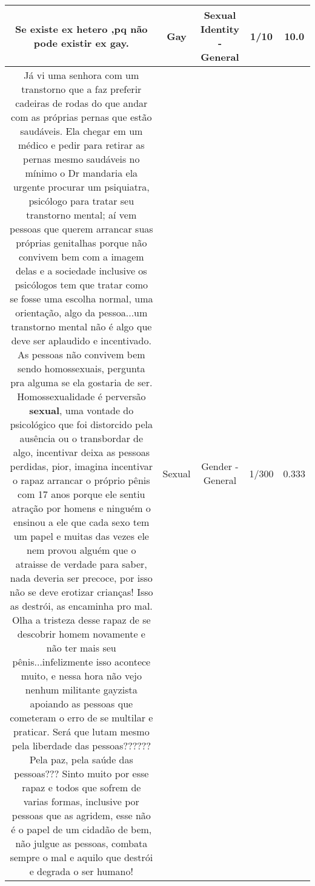 \documentclass[11pt]{article}
\newlength\mylength
\begin{document}
\begin{center}
\begin{longtable}{|C{.65\mylength}|C{.30\mylength}|C{.12\mylength}|C{.12\mylength}|C{.12\mylength}|}
  \small Se existe ex hetero ,pq não pode existir ex \textbf{gay}.\normalsize   & Gay & Sexual Identity - General & 1/10 & 10.0 \\  \hline
  \small Já vi uma senhora com um transtorno que a faz preferir cadeiras de rodas do que andar com as próprias pernas que estão saudáveis. Ela chegar em um médico e pedir para retirar as pernas mesmo saudáveis no mínimo o Dr mandaria ela urgente procurar um psiquiatra, psicólogo para tratar seu transtorno mental; aí vem pessoas que querem arrancar suas próprias genitalhas porque não convivem bem com a imagem delas e a sociedade inclusive os psicólogos tem que tratar como se fosse uma escolha normal, uma orientação, algo da pessoa...um transtorno mental não é algo que deve ser aplaudido e incentivado. As pessoas não convivem bem sendo homossexuais, pergunta pra alguma se ela gostaria de ser. Homossexualidade é perversão \textbf{sexual}, uma vontade do psicológico que foi distorcido pela ausência ou o transbordar de algo, incentivar deixa as pessoas perdidas, pior, imagina incentivar o rapaz arrancar o próprio pênis com 17 anos porque ele sentiu atração por homens e ninguém o ensinou a ele que cada sexo tem um papel e muitas das vezes ele nem provou alguém que o atraisse de verdade para saber, nada deveria ser precoce, por isso não se deve erotizar crianças! Isso as destrói, as encaminha pro mal.  Olha a tristeza desse rapaz de se descobrir homem novamente e não ter mais seu pênis...infelizmente isso acontece muito, e nessa hora não vejo nenhum militante gayzista apoiando as pessoas que cometeram o erro de se multilar e praticar. Será  que lutam mesmo pela liberdade das pessoas?????? Pela paz, pela saúde das pessoas??? Sinto muito por esse rapaz e todos que sofrem de varias formas, inclusive por pessoas que as agridem, esse não é o papel de um cidadão de bem, não julgue as pessoas, combata sempre o  mal e aquilo que destrói e degrada o ser humano!\normalsize   & Sexual & Gender - General & 1/300 & 0.333 \\  \hline

\end{longtable}
\end{center}
\end{document}
